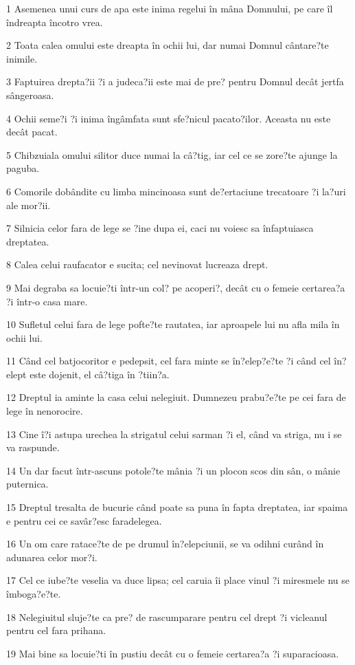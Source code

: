 \par 1 Asemenea unui curs de apa este inima regelui în mâna Domnului, pe care îl îndreapta încotro vrea.
\par 2 Toata calea omului este dreapta în ochii lui, dar numai Domnul cântare?te inimile.
\par 3 Faptuirea drepta?ii ?i a judeca?ii este mai de pre? pentru Domnul decât jertfa sângeroasa.
\par 4 Ochii seme?i ?i inima îngâmfata sunt sfe?nicul pacato?ilor. Aceasta nu este decât pacat.
\par 5 Chibzuiala omului silitor duce numai la câ?tig, iar cel ce se zore?te ajunge la paguba.
\par 6 Comorile dobândite cu limba mincinoasa sunt de?ertaciune trecatoare ?i la?uri ale mor?ii.
\par 7 Silnicia celor fara de lege se ?ine dupa ei, caci nu voiesc sa înfaptuiasca dreptatea.
\par 8 Calea celui raufacator e sucita; cel nevinovat lucreaza drept.
\par 9 Mai degraba sa locuie?ti într-un col? pe acoperi?, decât cu o femeie certarea?a ?i într-o casa mare.
\par 10 Sufletul celui fara de lege pofte?te rautatea, iar aproapele lui nu afla mila în ochii lui.
\par 11 Când cel batjocoritor e pedepsit, cel fara minte se în?elep?e?te ?i când cel în?elept este dojenit, el câ?tiga în ?tiin?a.
\par 12 Dreptul ia aminte la casa celui nelegiuit. Dumnezeu prabu?e?te pe cei fara de lege în nenorocire.
\par 13 Cine î?i astupa urechea la strigatul celui sarman ?i el, când va striga, nu i se va raspunde.
\par 14 Un dar facut într-ascuns potole?te mânia ?i un plocon scos din sân, o mânie puternica.
\par 15 Dreptul tresalta de bucurie când poate sa puna în fapta dreptatea, iar spaima e pentru cei ce savâr?esc faradelegea.
\par 16 Un om care ratace?te de pe drumul în?elepciunii, se va odihni curând în adunarea celor mor?i.
\par 17 Cel ce iube?te veselia va duce lipsa; cel caruia îi place vinul ?i miresmele nu se îmboga?e?te.
\par 18 Nelegiuitul sluje?te ca pre? de rascumparare pentru cel drept ?i vicleanul pentru cel fara prihana.
\par 19 Mai bine sa locuie?ti în pustiu decât cu o femeie certarea?a ?i suparacioasa.
